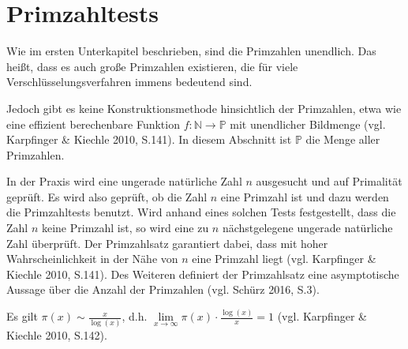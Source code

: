 \newpage

\section{Primzahltests}

Wie im ersten Unterkapitel beschrieben, sind die Primzahlen
unendlich. Das heißt, dass es auch große Primzahlen
existieren, die für viele Verschlüsselungsverfahren immens
bedeutend sind.

Jedoch gibt es keine Konstruktionsmethode hinsichtlich der
Primzahlen, etwa wie eine effizient berechenbare Funktion
$f : \mathbb{N} \to \mathbb{P}$ mit unendlicher Bildmenge
(vgl. Karpfinger \& Kiechle 2010, S.141).
In diesem Abschnitt ist $\mathbb{P}$ die Menge aller
Primzahlen.

In der Praxis wird eine ungerade natürliche Zahl $n$
ausgesucht und auf Primalität geprüft. Es wird also geprüft,
ob die Zahl $n$ eine Primzahl ist und dazu werden die
Primzahltests benutzt. Wird anhand eines solchen Tests
festgestellt, dass die Zahl $n$ keine Primzahl ist, so
wird eine zu $n$ nächstgelegene ungerade natürliche Zahl
überprüft. Der Primzahlsatz garantiert dabei, dass mit
hoher Wahrscheinlichkeit in der Nähe von $n$ eine Primzahl
liegt (vgl. Karpfinger \& Kiechle 2010, S.141).
Des Weiteren definiert der Primzahlsatz eine asymptotische
Aussage über die Anzahl der Primzahlen (vgl. Schürz 2016, S.3).

\begin{mythm}[Primzahlsatz]
Es gilt \( \pi (x) \sim \frac{x}{\log(x)}\), d.h.
\( \lim\limits_{x\to\infty} \pi(x)\cdot \frac{\log(x)}{x} = 1 \)
(vgl. Karpfinger \& Kiechle 2010, S.142).
\end{mythm}

